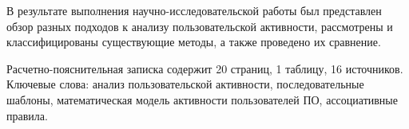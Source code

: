 
В результате выполнения научно-исследовательской работы был представлен обзор разных подходов к анализу пользовательской активности, рассмотрены и классифицированы существующие методы, а также проведено их сравнение.

Расчетно-пояснительная записка содержит 20 страниц, 1 таблицу, 16 источников. Ключевые слова: анализ пользовательской активности, последовательные шаблоны, математическая модель активности пользователей ПО, ассоциативные правила.

%
%
%

%
